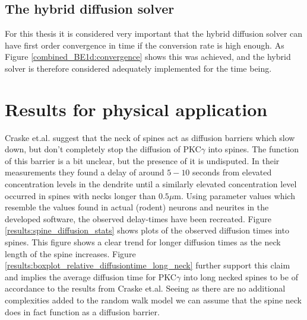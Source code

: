 \subsection{The hybrid diffusion solver}
For this thesis it is considered very important that the hybrid diffusion solver can have first order convergence in time if the conversion rate is high enough. 
As Figure \ref{combined_BE1d:convergence} shows this was achieved, and the hybrid solver is therefore considered adequately implemented for the time being.

\section{Results for physical application}

Craske et.al. suggest that the neck of spines act as diffusion barriers which slow down, but don't completely stop the diffusion of PKC$\gamma$ into spines. 
The function of this barrier is a bit unclear, but the presence of it is undisputed. 
In their measurements they found a delay of around $5-10$ seconds from elevated concentration levels in the dendrite until a similarly elevated concentration level occurred in spines with necks longer than $0.5\mu$m. 
Using parameter values which resemble the values found in actual (rodent) neurons and neurites in the developed software, the observed delay-times have been recreated. 
Figure \ref{results:spine_diffusion_stats} shows plots of the observed diffusion times into spines. 
This figure shows a clear trend for longer diffusion times as the neck length of the spine increases. 
Figure \ref{results:boxplot_relative_diffusiontime_long_neck} further support this claim and implies the average diffusion time for PKC$\gamma$ into long necked spines to be of accordance to the results from Craske et.al.
Seeing as there are no additional complexities added to the random walk model we can assume that the spine neck does in fact function as a diffusion barrier.

